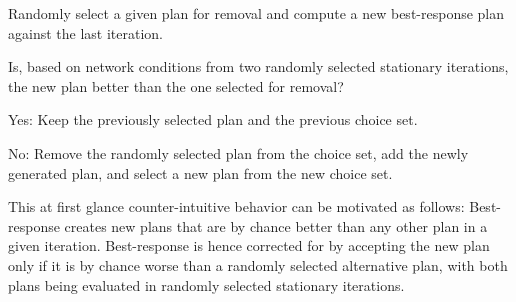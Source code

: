 \begin{compactenum}
\item Randomly select a given plan for removal
%
%
%
%
%
and compute a new best-response plan against the last iteration.
\item Is, based on network conditions from two randomly selected stationary
iterations, the new plan better than the one selected for removal?

\begin{compactitem}
\item Yes: Keep the previously selected plan and the previous choice set.
\item No: Remove the randomly selected plan from the choice set, add the
newly generated plan, and select a new plan from the new choice set.
\end{compactitem}
\end{compactenum}
This at first glance counter-intuitive behavior can be motivated as follows:
Best-response creates new plans that are by chance better
%
%
than any other plan in a given iteration. Best-response is
hence corrected for by accepting the new plan only if it is by chance
worse than a randomly selected alternative plan, with both plans being
evaluated in randomly selected stationary iterations.

